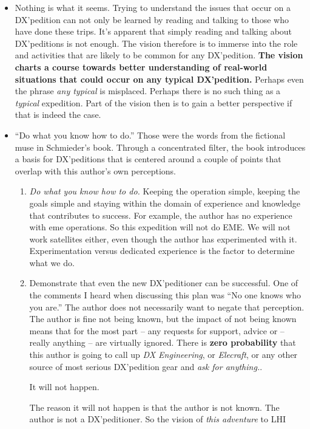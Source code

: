 \documentclass[11pt]{article}
\begin{document}
\begin{itemize}
\item Nothing is what it seems.  Trying to understand the issues
that occur on a DX'pedition can not only be learned by reading and talking
to those who have done these trips.  It's apparent that simply 
reading and talking about DX'peditions is not enough.  The vision therefore
is to immerse into the role and activities that are likely to be common
for any DX'pedition.  {\textbf{The vision charts a course towards
better understanding of real-world situations that could occur on
any typical DX'pedition.}}  Perhaps even the phrase
{\textit{any typical}} is misplaced.  Perhaps there is no such thing
as a {\textit{typical}} expedition.  Part of the vision then is to
gain a better perspective if that is indeed the case.
\item ``Do what you know how to do.'' Those were the words
from the fictional muse in Schmieder's book.  Through a concentrated
filter, the book introduces a basis for DX'peditions that is centered
around a couple of points that overlap with this author's own perceptions.
   \begin{enumerate}
     \item {\textit{Do what you know how to do.}}  Keeping the operation
simple, keeping the goals simple and staying within the domain of 
experience and knowledge that contributes to success.  For example, the
author has no experience with {\gls{eme}}  operations.  So
this expedition will not do EME.   We will not work satellites either,
even though the author has experimented with it.  Experimentation versus
dedicated experience is the factor to determine what we do.
    \item Demonstrate that even the new DX'peditioner can be successful.
One of the comments I heard when discussing this plan was ``No one knows
who you are.''   The author does not necessarily want to negate that
perception.  The author is fine not being known, but the impact of not
being known means that for the most part -- any requests for support,
advice or -- really anything -- are virtually ignored.   There is
{\textbf{zero probability}} that this author is going to call up
{\textit{DX Engineering}}, or {\textit{Elecraft}}, or any other
source of most serious DX'pedition gear and {\textit{ask for anything.}}.
\par
It will not happen.
\par
The reason it will not happen is that the author is not known.  The author is
not a DX'peditioner.   So the vision of {\textit{this adventure}} to LHI

\end{enumerate}
\end{itemize}
\end{document}
